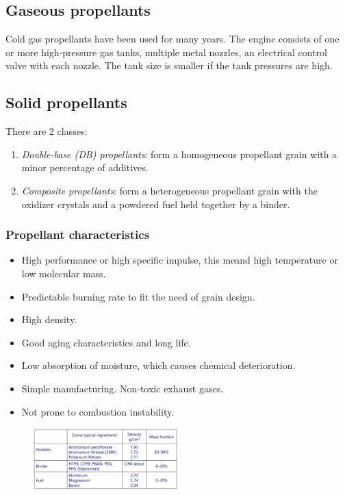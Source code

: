 \documentclass[12pt]{article}
\begin{document}
\subsection{Gaseous propellants}

Cold gas propellants have been used for many years. The engine consists of one or more high-pressure gas tanks, multiple metal nozzles, an electrical control valve with each nozzle. The tank size is smaller if the tank pressures are high.

\subsection{Solid propellants}

There are 2 classes:

\begin{enumerate}
    \item \textit{Double-base (DB) propellants}: form a homogeneous propellant grain with a minor percentage of additives.
    \item \textit{Composite propellants}: form a heterogeneous propellant grain with the oxidizer crystals and a powdered fuel held together by a binder.
\end{enumerate}

\subsubsection{Propellant characteristics}

\begin{itemize}
    \item High performance or high specific impulse, this meand high temperature or low molecular mass.
    \item Predictable burning rate to fit the need of grain design.
    \item High density.
    \item Good aging characteristics and long life.
    \item Low absorption of moisture, which causes chemical deterioration.
    \item Simple manufacturing. Non-toxic exhaust gases.
    \item Not prone to combustion instability.
\end{itemize}

\begin{figure}[!ht]
\centering
\includegraphics[width=0.5\textwidth]{figures/table.png}
\end{figure}
\end{document}
